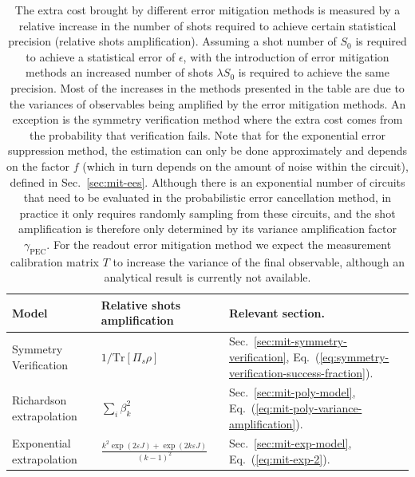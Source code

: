 \begin{table}[ht]
    \centering
    \caption{
    The extra cost brought by different error mitigation methods is measured by a relative increase in the number of shots required to achieve certain statistical precision (relative shots amplification). 
    Assuming a shot number of $S_0$ is required to achieve a statistical error of $\epsilon$, with the introduction of error mitigation methods an increased number of shots $\lambda S_0$ is required to achieve the same precision. Most of the increases in the methods presented in the table are due to the variances of observables being amplified by the error mitigation methods.
    An exception is the symmetry verification method where the extra cost comes from the probability that verification fails.
    Note that for the exponential error suppression method, the estimation can only be done approximately
and depends on the factor $f$ (which in turn depends on the amount of noise within the circuit), defined in Sec.~\ref{sec:mit-ees}.
    Although there is an exponential number of circuits that need
    to be evaluated in the probabilistic error cancellation method, in practice it only
    requires randomly sampling from these circuits, and the shot amplification is therefore only determined by its
    variance amplification factor $\gamma_{\mathrm{PEC}}$. 
    For the readout error mitigation method we expect the measurement calibration matrix $T$ to increase the variance of the final observable, although an analytical result is currently not available.
    }
    \label{tab:mit-costs}
    \begin{tabularx}{\textwidth}{llll}
        \toprule
        Model & Relative shots amplification & Relevant section.
        \\ \midrule
        Symmetry Verification \cite{mcardleErrorMitigatedDigitalQuantum2019,Sagastizabal2019,bonet-monroigLowcostErrorMitigation2018} & $1/\mathrm{Tr}[\Pi_{s}\rho]$ 
        & Sec.~\ref{sec:mit-symmetry-verification}, Eq.~(\ref{eq:symmetry-verification-success-fraction}).
        \\  %
        Richardson extrapolation \cite{temmeErrorMitigationShortDepth2017,liEfficientVariationalQuantum2017} & $\sum_i \beta_k^2$
        & Sec.~\ref{sec:mit-poly-model}, Eq.~(\ref{eq:mit-poly-variance-amplification}).
        \\  %
        Exponential extrapolation \cite{endoPracticalQuantumError2018} & $ \frac{k^{2} \exp(2\varepsilon J)+\exp(2 k \varepsilon J )}{(k-1)^{2}}$
        & Sec.~\ref{sec:mit-exp-model}, Eq.~(\ref{eq:mit-exp-2}).

\end{tabularx}
\end{table}
